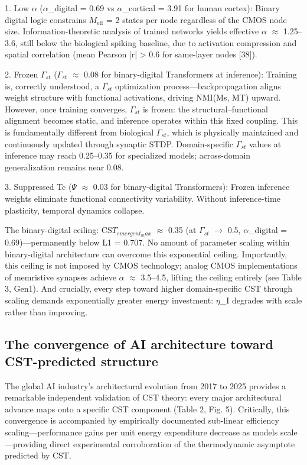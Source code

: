 \documentclass[a4paper,12pt]{article}
\begin{document}
1. Low $\alpha$ ($\alpha$_digital = 0.69 vs $\alpha$_cortical = 3.91 for human cortex): Binary digital logic constrains $M_{\text{eff}}$ = 2 states per node regardless of the CMOS node size. Information-theoretic analysis of trained networks yields effective $\alpha$ $\approx$ 1.25--3.6, still below the biological spiking baseline, due to activation compression and spatial correlation (mean Pearson |r| > 0.6 for same-layer nodes [38]).


2.
Frozen $\Gamma_{st}$ ($\Gamma_{st}$ $\approx$ 0.08 for binary-digital Transformers at inference): Training is, correctly understood, a $\Gamma_{st}$ optimization process---backpropagation aligns weight structure with functional activations, driving NMI(Ms, MT) upward.
However, once training converges, $\Gamma_{st}$ is frozen: the structural--functional alignment becomes static, and inference operates within this fixed coupling.
This is fundamentally different from biological $\Gamma_{st}$, which is physically maintained and continuously updated through synaptic STDP.
Domain-specific $\Gamma_{st}$ values at inference may reach 0.25--0.35 for specialized models; across-domain generalization remains near 0.08.


3. Suppressed Tc ($\Psi$ $\approx$ 0.03 for binary-digital Transformers): Frozen inference weights eliminate functional connectivity variability. Without inference-time plasticity, temporal dynamics collapse.


The binary-digital ceiling: CS$T_{emergent_max}$ $\approx$ 0.35 (at $\Gamma_{st}$ $\rightarrow$ 0.5, $\alpha$_digital = 0.69)---permanently below L1 = 0.707.
No amount of parameter scaling within binary-digital architecture can overcome this exponential ceiling.
Importantly, this ceiling is not imposed by CMOS technology; analog CMOS implementations of memristive synapses achieve $\alpha$ $\approx$ 3.5--4.5, lifting the ceiling entirely (see Table 3, Gen1).
And crucially, every step toward higher domain-specific CST through scaling demands exponentially greater energy investment: $\eta$_I degrades with scale rather than improving.



\subsection{The convergence of AI architecture toward CST-predicted structure}

The global AI industry's architectural evolution from 2017 to 2025 provides a remarkable independent validation of CST theory: every major architectural advance maps onto a specific CST component (Table 2, Fig. 5). Critically, this convergence is accompanied by empirically documented sub-linear efficiency scaling---performance gains per unit energy expenditure decrease as models scale---providing direct experimental corroboration of the thermodynamic asymptote predicted by CST.
\end{document}
